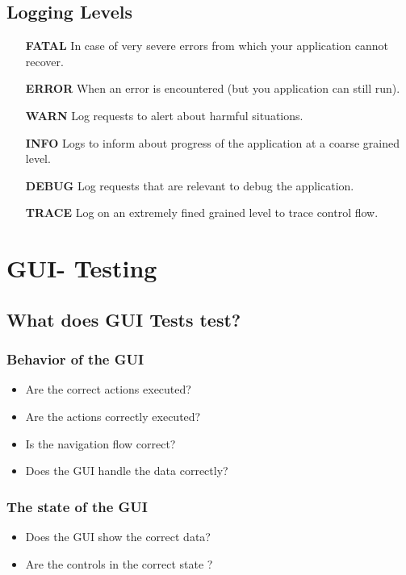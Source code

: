 \documentclass[a4paper,10pt]{article}
\newcommand{\Bold}[1]{\textbf{#1}} %
\begin{document}
\subsection{Logging Levels}
\begin{itemize}
	\item[\Bold {FATAL}] In case of very severe errors from which your application cannot recover.
	\item[\Bold {ERROR}] When an error is encountered (but you application can still run).
	\item[\Bold {WARN}] Log requests to alert about harmful situations.
	\item[\Bold {INFO}] Logs to inform about progress of the application at a coarse grained level.
	\item[\Bold {DEBUG}] Log requests that are relevant to debug the application.
	\item[\Bold {TRACE}] Log on an extremely fined grained level to trace control flow.
\end{itemize}

\section{GUI- Testing}
\subsection{What does GUI Tests test?}
\subsubsection{Behavior of the GUI}
\begin{itemize}
\item Are the correct actions executed?
\item Are the actions correctly executed?
\item Is the navigation flow correct?
\item Does the GUI handle the data correctly?
\end{itemize}
\subsubsection{The state of the GUI}
\begin{itemize}
\item Does the GUI show the correct data?
\item Are the controls in the correct state ?
\end{itemize}
\end{document}
